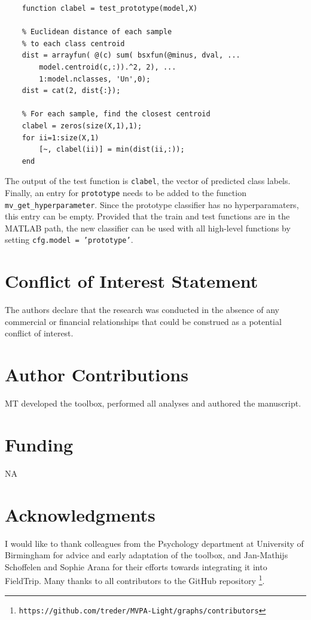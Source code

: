 \documentclass[utf8]{frontiersSCNS} %
\newcommand{\ttt}[1]{\texttt{#1}}
\begin{document}
\begin{verbatim}
    function clabel = test_prototype(model,X)

    % Euclidean distance of each sample
    % to each class centroid
    dist = arrayfun( @(c) sum( bsxfun(@minus, dval, ...
        model.centroid(c,:)).^2, 2), ...
        1:model.nclasses, 'Un',0);
    dist = cat(2, dist{:});

    % For each sample, find the closest centroid
    clabel = zeros(size(X,1),1);
    for ii=1:size(X,1)
        [~, clabel(ii)] = min(dist(ii,:));
    end

\end{verbatim}

The output of the test function is \ttt{clabel}, the vector of predicted class labels. Finally, an entry for \ttt{prototype} needs to be added to the function \ttt{mv\_get\_hyperparameter}. Since the prototype classifier has no hyperparamaters, this entry can be empty. Provided that the train and test functions are in the MATLAB path, the new classifier can be used with all high-level functions by setting \ttt{cfg.model = 'prototype'}.


\section*{Conflict of Interest Statement}

The authors declare that the research was conducted in the absence of any commercial or financial relationships that could be construed as a potential conflict of interest.

\section*{Author Contributions}

MT developed the toolbox, performed all analyses and authored the manuscript.

\section*{Funding}
NA

\section*{Acknowledgments}
I would like to thank colleagues from the Psychology department at University of Birmingham for advice and early adaptation of the toolbox, and Jan-Mathijs Schoffelen and Sophie Arana for their efforts towards integrating it into FieldTrip. Many thanks to all contributors to the GitHub repository
\footnote{\ttt{https://github.com/treder/MVPA-Light/graphs/contributors}}.
\end{document}
